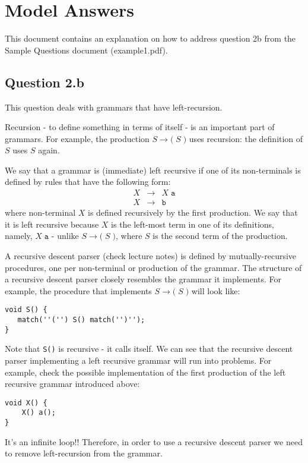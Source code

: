 \documentclass[11pt]{article}
\newcommand{\rul}{\rightarrow}
\newcommand{\syntax}[1]{\texttt{#1}}
\begin{document}
\section*{Model Answers}

This document contains an explanation on how to address question 2b from the Sample Questions document (example1.pdf).


\subsection*{Question 2.b}

This question deals with grammars that have left-recursion. 

Recursion - to define something in terms of itself - is an important part of grammars. For example, the production $S \rul \syntax{(}\;S\;\syntax{)}$ uses recursion: the definition of $S$ uses $S$ again.

We say that a grammar is (immediate) left recursive if one of its non-terminals is defined by rules that have the following form:
$$
\begin{array}{rcl}
X & \rul & X \; \syntax{a}  \\
X & \rul & \syntax{b}
\end{array}
$$
where non-terminal $X$ is defined recursively by the first production. We say that it is left recursive because $X$ is the left-most term in one of its definitions, namely, $X\;\syntax{a}$ - unlike  $S \rul \syntax{(}\;S\;\syntax{)}$, where $S$ is the second term of the production.

A recursive descent parser (check lecture notes) is defined by mutually-recursive procedures, one per non-terminal or production of  the grammar. The structure of a recursive descent parser closely resembles the grammar it implements.
For example, the procedure that implements $S \rul \syntax{(}\;S\;\syntax{)}$ will look like:
\begin{verbatim}
void S() {
   match(''('') S() match('')'');
}
\end{verbatim}
Note that \verb+S()+ is recursive - it calls itself. We can see that the recursive descent parser implementing a left recursive grammar will run into problems. For example, check the possible implementation of the first production of the left recursive grammar introduced above:
\begin{verbatim}
void X() {
    X() a();
}
\end{verbatim}

It's an infinite loop!! Therefore, in order to use a recursive descent parser we need to remove left-recursion from the grammar. 
\end{document}
